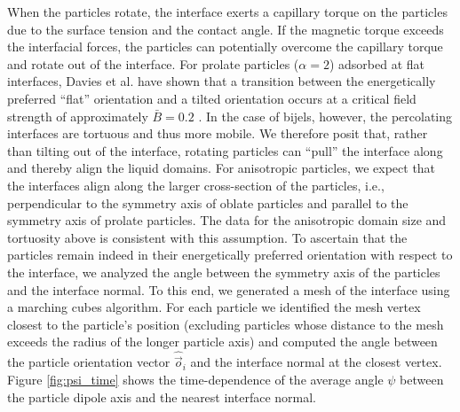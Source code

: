 When the particles rotate, the interface exerts a capillary torque on
the particles due to the surface tension and the contact angle. If the
magnetic torque exceeds the interfacial forces, the particles can
potentially overcome the capillary torque and rotate out of the
interface. For prolate particles (\(\alpha=2\)) adsorbed at flat
interfaces, Davies et al. have shown that a transition between the
energetically preferred ``flat'' orientation and a tilted orientation
occurs at a critical field strength of approximately \(\bar{B}=0.2\)
\cite{bresme_orientational_2007,davies_interface_2014,newton_influence_2014}.
In the case of bijels, however, the percolating interfaces are tortuous
and thus more mobile. We therefore posit that, rather than tilting out
of the interface, rotating particles can ``pull'' the interface along
and thereby align the liquid domains. For anisotropic particles, we
expect that the interfaces align along the larger cross-section of the
particles, i.e., perpendicular to the symmetry axis of oblate particles
and parallel to the symmetry axis of prolate particles. The data for the
anisotropic domain size and tortuosity above is consistent with this
assumption. To ascertain that the particles remain indeed in their
energetically preferred orientation with respect to the interface, we
analyzed the angle between the symmetry axis of the particles and the
interface normal. To this end, we generated a mesh of the interface
using a marching cubes algorithm. For each particle we identified the
mesh vertex closest to the particle's position (excluding particles
whose distance to the mesh exceeds the radius of the longer particle
axis) and computed the angle between the particle orientation vector
\(\hat{\vec{o}}_i\) and the interface normal at the closest vertex.
Figure \ref{fig:psi_time} shows the time-dependence of the average angle
\(\psi\) between the particle dipole axis and the nearest interface
normal.

